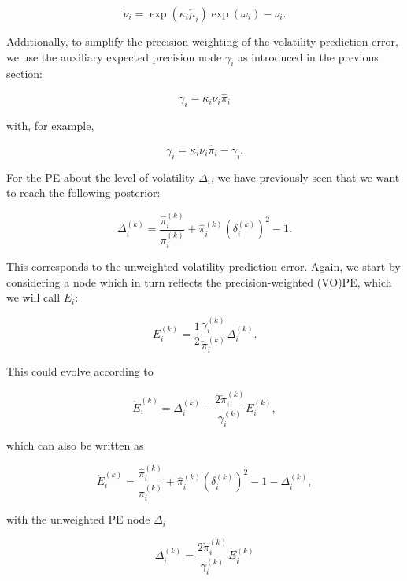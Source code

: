 \begin{equation}
	\dot{\nu}_i = \exp(\kappa_i \check{\mu}_i) \exp(\omega_i) - \nu_i.
\end{equation}

Additionally, to simplify the precision weighting of the volatility prediction error, we use the auxiliary expected precision node $\gamma_i$ as introduced in the previous section:

\begin{equation}
  \gamma_i = \kappa_i \nu_i \hat{\pi}_i
\end{equation}

with, for example, 

\begin{equation}
  \dot{\gamma}_i = \kappa_i \nu_i \hat{\pi}_i - \gamma_i.
\end{equation}

For the \textsf{PE} about the level of volatility $\Delta_i$, we have previously seen that we want to reach the following posterior:

\begin{equation}
	\Delta_i^{(k)} = \frac{\hat{\pi}_i^{(k)}}{\pi_{i}^{(k)}} + \hat{\pi}_i^{(k)} (\delta_i^{(k)})^2 - 1.
\end{equation}

This corresponds to the unweighted volatility prediction error. Again, we start by considering a node which in turn reflects the precision-weighted (VO)PE, which we will call $E_i$:

\begin{equation}
	E_i^{(k)} = \frac{1}{2} \frac{\gamma_i^{(k)}}{\check{\pi}_i^{(k)}} \Delta_i^{(k)}.
\end{equation}

This could evolve according to 

\begin{equation}
	\dot{E}_i^{(k)} = \Delta_i^{(k)} - \frac{2 \check{\pi}_i^{(k)}}{\gamma_i^{(k)}} E_i^{(k)},
\end{equation}

which can also be written as 

\begin{equation}
	\dot{E}_i^{(k)} = \frac{\hat{\pi}_i^{(k)}}{\pi_{i}^{(k)}} + \hat{\pi}_i^{(k)} (\delta_i^{(k)})^2 - 1 - \Delta_i^{(k)},
\end{equation}

with the unweighted PE node $\Delta_i$

\begin{equation}
	\Delta_i^{(k)} = \frac{2 \check{\pi}_i^{(k)}}{\gamma_i^{(k)}} E_i^{(k)}
\end{equation}

